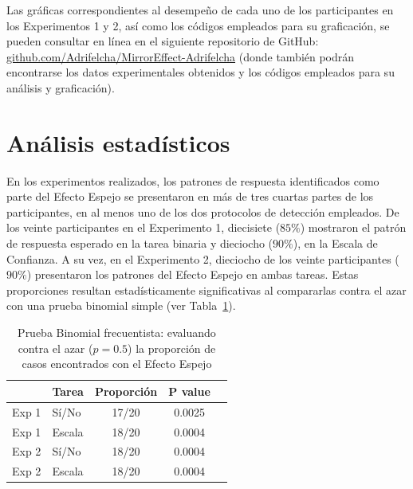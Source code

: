 Las gráficas correspondientes al desempeño de cada uno de los participantes en los Experimentos 1 y 2, así como los códigos empleados para su graficación, se pueden consultar en línea en el siguiente repositorio de GitHub: \href{http://github.com/Adrifelcha/MirrorEffect-Adrifelcha}{github.com/Adrifelcha/MirrorEffect-Adrifelcha} (donde también podrán encontrarse los datos experimentales obtenidos y los códigos empleados para su análisis y graficación).\\




































\section{Análisis estadísticos}

En los experimentos realizados, los patrones de respuesta identificados como parte del Efecto Espejo se presentaron en más de tres cuartas partes de los participantes, en al menos uno de los dos protocolos de detección empleados. De los veinte participantes en el Experimento 1, diecisiete ($85\%$) mostraron el patrón de respuesta esperado en la tarea binaria y dieciocho ($90\%$), en la Escala de Confianza. A su vez, en el Experimento 2, dieciocho de los veinte participantes ($90\%$) presentaron los patrones del Efecto Espejo en ambas tareas. Estas proporciones resultan estadísticamente significativas al compararlas contra el azar con una prueba binomial simple (ver Tabla~\ref{Tabla_Binom}).\\

\begin{table}[h]
\caption[Prueba Binomial frecuentista: evaluando contra el azar la proporción de casos encontrados con el Efecto Espejo]{Prueba Binomial frecuentista: evaluando contra el azar ($p=0.5$) la proporción de casos encontrados con el Efecto Espejo}
\label{Tabla_Binom}
\centering
\begin{tabular}{l l | c c c}
\toprule
\textbf{} & \textbf{Tarea} & \textbf{Proporción} & \textbf{P value}\\
\midrule
Exp 1 & Sí/No & 17/20 & 0.0025 \\
Exp 1 & Escala & 18/20 & 0.0004\\
Exp 2 & Sí/No & 18/20 & 0.0004\\
Exp 2 & Escala & 18/20 & 0.0004\\
\bottomrule
\end{tabular}
\end{table}



